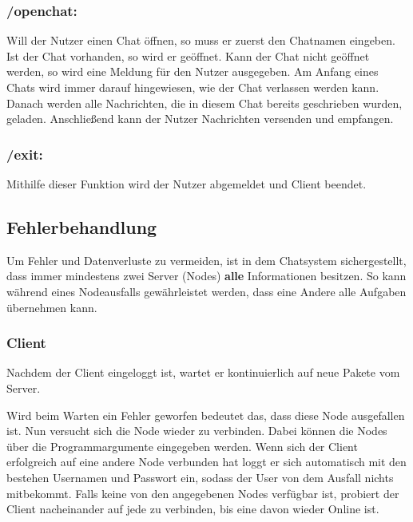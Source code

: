 \subsubsection*{/openchat:}
Will der Nutzer einen Chat öffnen, so muss er zuerst den Chatnamen eingeben. Ist der Chat vorhanden, so wird er geöffnet.
Kann der Chat nicht geöffnet werden, so wird eine Meldung für den Nutzer ausgegeben.
Am Anfang eines Chats wird immer darauf hingewiesen, wie der Chat
verlassen werden kann. Danach werden alle Nachrichten, die in diesem Chat bereits geschrieben wurden, geladen.
Anschließend kann der Nutzer Nachrichten versenden und empfangen.

\subsubsection*{/exit:}
Mithilfe dieser Funktion wird der Nutzer abgemeldet und Client beendet.
\clearpage

\author{Matthias Vonend, Aaron Schweig, Troy Keßler}
\subsection{Fehlerbehandlung}
Um Fehler und Datenverluste zu vermeiden, ist in dem Chatsystem sichergestellt, dass immer mindestens zwei Server (Nodes) \textbf{alle}
Informationen besitzen. So kann während eines Nodeausfalls gewährleistet werden, dass eine Andere alle Aufgaben übernehmen kann.

\subsubsection{Client}
Nachdem der Client eingeloggt ist, wartet er kontinuierlich auf neue Pakete vom Server. 



Wird beim Warten ein Fehler geworfen 
bedeutet das, dass diese Node ausgefallen ist. Nun versucht sich die Node wieder zu verbinden. 
Dabei können die Nodes über die Programmargumente eingegeben werden. Wenn sich der Client erfolgreich auf eine andere Node 
verbunden hat loggt er sich automatisch mit den bestehen Usernamen und Passwort ein, sodass der User von dem Ausfall nichts 
mitbekommt. Falls keine von den angegebenen Nodes verfügbar ist, probiert der Client nacheinander auf jede zu verbinden, 
bis eine davon wieder Online ist.

